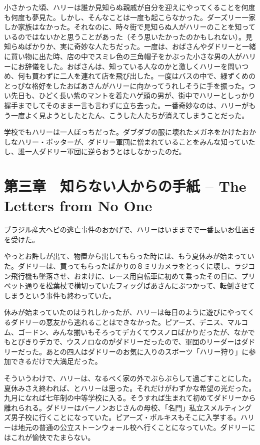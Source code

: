 \documentclass[10pt,a4paper]{article}
\begin{document}
\begin{CJK}{UTF8}{min}
小さかった頃、ハリーは誰か見知らぬ親戚が自分を迎えにやってくることを何度も何度も夢見た。しかし、そんなことは一度も起こらなかった。ダーズリー一家しか家族はなかった。それなのに、時々街で見知らぬ人がハリーのことを知っているのではないかと思うことがあった（そう思いたかったのかもしれない）。見知らぬばかりか、実に奇妙な人たちだった。一度は、おばさんやダドリーと一緒に買い物に出た時、店の中でスミレ色の三角帽子をかぶった小さな男の人がハリーにお辞儀をした。おばさんは、知っている人なのかと激しくハリーを問いつめ、何も買わずに二人を連れて店を飛び出した。一度はバスの中で、緑ずくめのとっぴな格好をしたおばあさんがハリーに向かってうれしそうに手を振った。つい先日も、ひどく長い紫のマントを着たハゲ頭の男が、街中でハリーとしっかり握手までしてそのまま一言も言わずに立ち去った。一番奇妙なのは、ハリーがもう一度よく見ようとしたとたん、こうした人たちが消えてしまうことだった。

学校でもハリーは一人ぼっちだった。ダブダブの服に壊れたメガネをかけたおかしなハリー・ポッターが、ダドリー軍団に憎まれていることをみんな知っていたし、誰一人ダドリー軍団に逆らおうとはしなかったのだ。



\section{第三章　知らない人からの手紙 -- The Letters from No One}



 ブラジル産大ヘビの逃亡事件のおかげで、ハリーはいままでで一番長いお仕置きを受けた。

やっとお許しが出て、物置から出してもらった時には、もう夏休みが始まっていた。ダドリーは、買ってもらったばかりの８ミリカメラをとっくに壊し、ラジコン飛行機も墜落させ、おまけに、レース用自転車に初めて乗ったその日に、プリベット通りを松葉杖で横切っていたフィッグばあさんにぶつかって、転倒させてしまうという事件も終わっていた。

休みが始まっていたのはうれしかったが、ハリーは毎日のように遊びにやってくるダドリーの悪友から逃れることはできなかった。ピアーズ、デニス、マルコム、ゴードン、みんな揃いもそろってデカくてウスノロばかりだったが、なかでもとびきりデカで、ウスノロなのがダドリーだったので、軍団のリーダーはダドリーだった。あとの四人はダドリーのお気に入りのスボーツ「ハリー狩り」に参加できるだけで大満足だった。

そういうわけで、ハリーは、なるべく家の外でぶらぶらして過ごすことにした。夏休みさえ終われば、とハリーは思った。それだけがわずかな希望の光だった。九月になれば七年制の中等学校に入る。そうすれば生まれて初めてダドリーから離れられる。ダドリーはバーノンおじさんの母校、「名門」私立スメルティングズ男子校に行くことになっていた。ピアーズ・ポルキスもそこに入学する。ハリーは地元の普通の公立ストーンウォール校へ行くことになっていた。ダドリーにはこれが愉快でたまらない。


\end{CJK}
\end{document}
